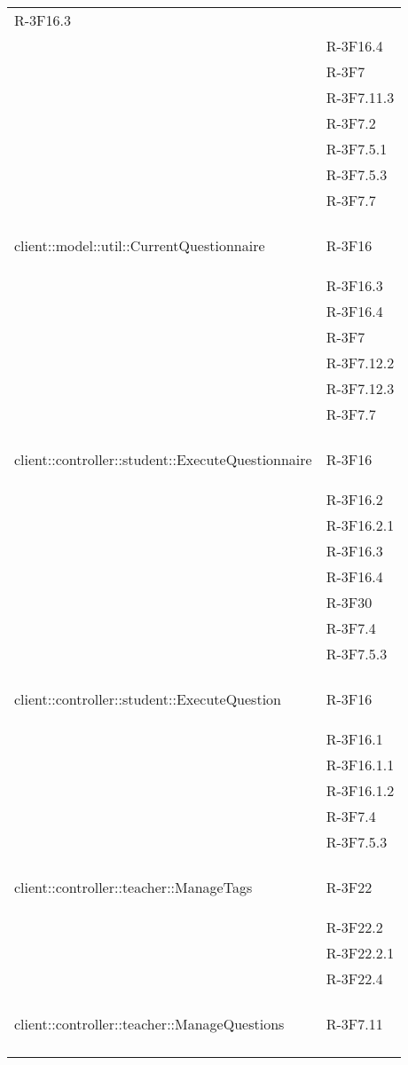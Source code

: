 \begin{longtable}{l p{3cm}}
R-3F16.3 \tabularnewline &

R-3F16.4 \tabularnewline &

R-3F7 \tabularnewline &

R-3F7.11.3 \tabularnewline &

R-3F7.2 \tabularnewline &

R-3F7.5.1 \tabularnewline &

R-3F7.5.3 \tabularnewline &

R-3F7.7 \tabularnewline &\tabularnewline
\midrule
\hypertarget{client::model::util::CurrentQuestionnaire}{client::model::util::CurrentQuestionnaire} & R-3F16 \tabularnewline &

R-3F16.3 \tabularnewline &

R-3F16.4 \tabularnewline &

R-3F7 \tabularnewline &

R-3F7.12.2 \tabularnewline &

R-3F7.12.3 \tabularnewline &

R-3F7.7 \tabularnewline &\tabularnewline
\midrule
\hypertarget{client::controller::student::ExecuteQuestionnaire}{client::controller::student::ExecuteQuestionnaire} & R-3F16 \tabularnewline &

R-3F16.2 \tabularnewline &

R-3F16.2.1 \tabularnewline &

R-3F16.3 \tabularnewline &

R-3F16.4 \tabularnewline &

R-3F30 \tabularnewline &

R-3F7.4 \tabularnewline &

R-3F7.5.3 \tabularnewline &\tabularnewline
\midrule
\hypertarget{client::controller::student::ExecuteQuestion}{client::controller::student::ExecuteQuestion} & R-3F16 \tabularnewline &

R-3F16.1 \tabularnewline &

R-3F16.1.1 \tabularnewline &

R-3F16.1.2 \tabularnewline &

R-3F7.4 \tabularnewline &

R-3F7.5.3 \tabularnewline &\tabularnewline
\midrule
\hypertarget{client::controller::teacher::ManageTags}{client::controller::teacher::ManageTags} & R-3F22 \tabularnewline &

R-3F22.2 \tabularnewline &

R-3F22.2.1 \tabularnewline &

R-3F22.4 \tabularnewline &\tabularnewline
\midrule
\hypertarget{client::controller::teacher::ManageQuestions}{client::controller::teacher::ManageQuestions} & R-3F7.11 \tabularnewline &


\end{longtable}

